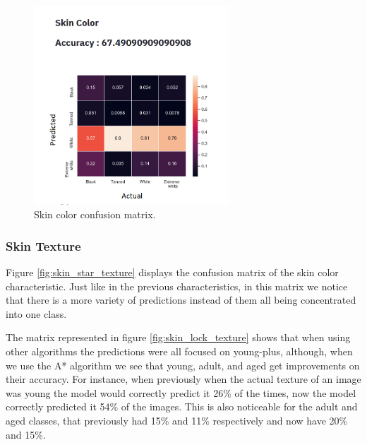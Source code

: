\documentclass[12pt,a4paper,oneside]{memoir}
\begin{document}
\begin{figure}[H]
\centering
\includegraphics[width=0.65\textwidth]{images/skin_star_color.png}
\caption{Skin color confusion matrix.}
\centering
\label{fig:skin_star_color}
\end{figure}



\subsubsection{Skin Texture}
Figure \ref{fig:skin_star_texture} displays the confusion matrix of the skin color characteristic. Just like in the previous characteristics, in this matrix we notice that there is a more variety of predictions instead of them all being concentrated into one class. 

\par

The matrix represented in figure \ref{fig:skin_lock_texture} shows that when using other algorithms the predictions were all focused on young-plus, although, when we use the A* algorithm we see that young, adult, and aged get improvements on their accuracy. For instance, when previously when the actual texture of an image was young the model would correctly predict it 26\% of the times, now the model correctly predicted it 54\% of the images. This is also noticeable for the adult and aged classes, that previously had 15\% and 11\% respectively and now have 20\% and 15\%. 
\end{document}
